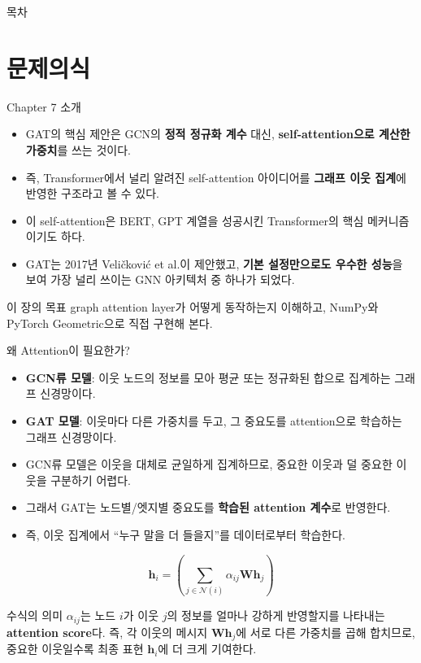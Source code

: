 \begin{frame}
  \titlepage
\end{frame}

\begin{frame}{목차}
  \tableofcontents
\end{frame}

\section{문제의식}

\begin{frame}{Chapter 7 소개}
\begin{itemize}
  \item GAT의 핵심 제안은 GCN의 \textbf{정적 정규화 계수} 대신, \textbf{self-attention으로 계산한 가중치}를 쓰는 것이다.
  \item 즉, Transformer에서 널리 알려진 self-attention 아이디어를 \textbf{그래프 이웃 집계}에 반영한 구조라고 볼 수 있다.
  \item 이 self-attention은 BERT, GPT 계열을 성공시킨 Transformer의 핵심 메커니즘이기도 하다.
  \item GAT는 2017년 Veli\v{c}kovi\'{c} et al.이 제안했고, \textbf{기본 설정만으로도 우수한 성능}을 보여 가장 널리 쓰이는 GNN 아키텍처 중 하나가 되었다.
\end{itemize}
\vspace{0.3em}
\begin{block}{이 장의 목표}
graph attention layer가 어떻게 동작하는지 이해하고, NumPy와 PyTorch Geometric으로 직접 구현해 본다.
\end{block}
\end{frame}

\begin{frame}{왜 Attention이 필요한가?}
\begin{itemize}
  \item \textbf{GCN류 모델}: 이웃 노드의 정보를 모아 평균 또는 정규화된 합으로 집계하는 그래프 신경망이다.
  \item \textbf{GAT 모델}: 이웃마다 다른 가중치를 두고, 그 중요도를 attention으로 학습하는 그래프 신경망이다.
  \item GCN류 모델은 이웃을 대체로 균일하게 집계하므로, 중요한 이웃과 덜 중요한 이웃을 구분하기 어렵다.
  \item 그래서 GAT는 노드별/엣지별 중요도를 \textbf{학습된 attention 계수}로 반영한다.
  \item 즉, 이웃 집계에서 ``누구 말을 더 들을지''를 데이터로부터 학습한다.
\end{itemize}
\vspace{0.4em}
\[
\mathbf{h}_i = \left(\sum_{j\in\mathcal{N}(i)} \alpha_{ij}\mathbf{W}\mathbf{h}_j\right)
\]

\begin{block}{수식의 의미}
  \tiny
$\alpha_{ij}$는 노드 $i$가 이웃 $j$의 정보를 얼마나 강하게 반영할지를 나타내는 \textbf{attention score}다.
즉, 각 이웃의 메시지 $\mathbf{W}\mathbf{h}_j$에 서로 다른 가중치를 곱해 합치므로, 중요한 이웃일수록 최종 표현 $\mathbf{h}_i$에 더 크게 기여한다.
\end{block}
\end{frame}

